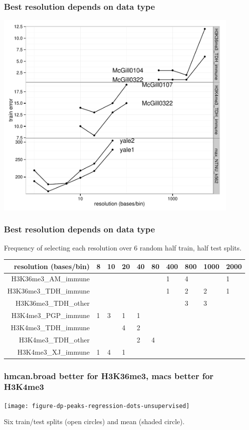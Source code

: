 \documentclass{beamer}
\begin{document}
\begin{frame}
  \frametitle{Best resolution depends on data type}
  \includegraphics[width=0.9\textwidth]{figure-overlapping-feasible}
\end{frame}

\begin{frame}
  \frametitle{Best resolution depends on data type}
  Frequency of selecting each resolution over 6 random half train,
  half test splits.

  \vskip 0.5cm

  \scriptsize
  \begin{tabular}{rlllllllll}
    \hline
    resolution (bases/bin)& 8 & 10 & 20 & 40 & 80 & 400 & 800 & 1000 & 2000 \\ 
    \hline
    H3K36me3\_AM\_immune &  &  &  &  &  & 1 & 4 &  & 1 \\ 
    H3K36me3\_TDH\_immune &  &  &  &  &  & 1 & 2 & 2 & 1 \\ 
    H3K36me3\_TDH\_other &  &  &  &  &  &  & 3 & 3 &  \\ 
    H3K4me3\_PGP\_immune & 1 & 3 & 1 & 1 &  &  &  &  &  \\ 
    H3K4me3\_TDH\_immune &  &  & 4 & 2 &  &  &  &  &  \\ 
    H3K4me3\_TDH\_other &  &  &  & 2 & 4 &  &  &  &  \\ 
    H3K4me3\_XJ\_immune & 1 & 4 & 1 &  &  &  &  &  &  \\ 
    \hline
  \end{tabular}
\end{frame}

\begin{frame}
  \frametitle{hmcan.broad better for H3K36me3, macs better for
    H3K4me3}

  \texttt{[image: figure-dp-peaks-regression-dots-unsupervised]}
  
  Six train/test splits (open circles) and mean (shaded circle).
\end{frame}
\end{document}
